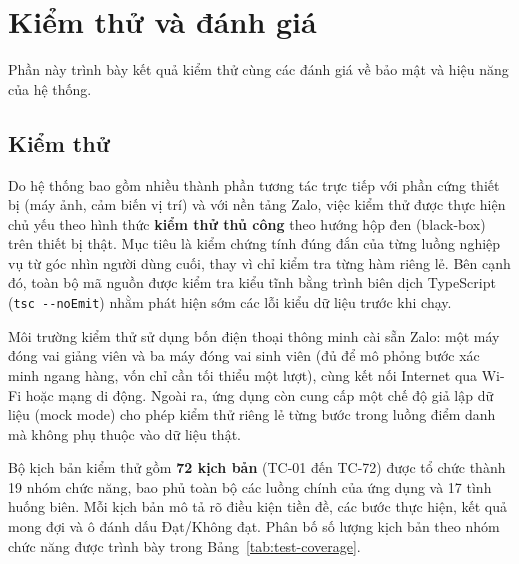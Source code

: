 \documentclass[../main.tex]{subfiles}
\begin{document}

\section{Kiểm thử và đánh giá}

Phần này trình bày kết quả kiểm thử cùng các đánh giá về bảo mật và hiệu năng của hệ thống.

\subsection{Kiểm thử}
\label{sec:kiem-thu}

Do hệ thống bao gồm nhiều thành phần tương tác trực tiếp với phần cứng thiết bị (máy ảnh,
cảm biến vị trí) và với nền tảng Zalo, việc kiểm thử được thực hiện chủ yếu theo hình thức
\textbf{kiểm thử thủ công} theo hướng hộp đen (black-box) trên thiết bị thật. Mục tiêu là
kiểm chứng tính đúng đắn của từng luồng nghiệp vụ từ góc nhìn người dùng cuối, thay vì chỉ
kiểm tra từng hàm riêng lẻ. Bên cạnh đó, toàn bộ mã nguồn được kiểm tra kiểu tĩnh bằng trình
biên dịch TypeScript (\texttt{tsc -{}-noEmit}) nhằm phát hiện sớm các lỗi kiểu dữ liệu trước
khi chạy.

Môi trường kiểm thử sử dụng bốn điện thoại thông minh cài sẵn Zalo: một máy đóng vai giảng
viên và ba máy đóng vai sinh viên (đủ để mô phỏng bước xác minh ngang hàng, vốn chỉ cần tối thiểu một
lượt), cùng kết nối Internet qua Wi-Fi hoặc mạng di động. Ngoài ra, ứng dụng còn cung cấp một
chế độ giả lập dữ liệu (mock mode) cho phép kiểm thử riêng lẻ từng bước trong luồng điểm danh
mà không phụ thuộc vào dữ liệu thật.

Bộ kịch bản kiểm thử gồm \textbf{72 kịch bản} (TC-01 đến TC-72) được tổ chức thành 19 nhóm
chức năng, bao phủ toàn bộ các luồng chính của ứng dụng và 17 tình huống biên. Mỗi kịch bản
mô tả rõ điều kiện tiền đề, các bước thực hiện, kết quả mong đợi và ô đánh dấu Đạt/Không đạt.
Phân bố số lượng kịch bản theo nhóm chức năng được trình bày trong
Bảng~\ref{tab:test-coverage}.
\end{document}
